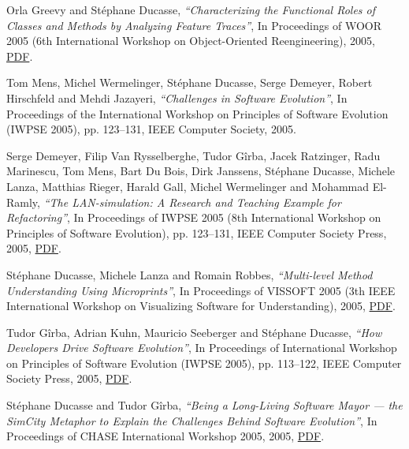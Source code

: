 \documentclass{article}
\newcommand{\czauthors}[1]{#1}
\newcommand{\cztitle}[1]{\emph{``#1''}}
\newcommand{\czbooktitle}[1]{#1}
\begin{document}
\begin{itemize}
	\pub  \czauthors{Orla Greevy and St\'ephane Ducasse},  \cztitle{Characterizing the Functional Roles of Classes and Methods by Analyzing Feature Traces},  In \czbooktitle{Proceedings of WOOR 2005 (6th International Workshop on Object-Oriented Reengineering)}, 2005, \href{http://rmod-files.lille.inria.fr/Team/Texts/Papers/Gree05bTraceScraperWOOR2005.pdf}{PDF}.

	\pub  \czauthors{Tom Mens, Michel Wermelinger, St\'ephane Ducasse, Serge Demeyer, Robert Hirschfeld and Mehdi Jazayeri},  \cztitle{Challenges in Software Evolution},  In \czbooktitle{Proceedings of the International Workshop on Principles of Software Evolution (IWPSE 2005)}, pp. 123--131, IEEE Computer Society, 2005.

	\pub  \czauthors{Serge Demeyer, Filip Van Rysselberghe, Tudor G\^irba, Jacek Ratzinger, Radu Marinescu, Tom Mens, Bart Du Bois, Dirk Janssens, St\'ephane Ducasse, Michele Lanza, Matthias Rieger, Harald Gall, Michel Wermelinger and Mohammad El-Ramly},  \cztitle{The {LAN}-simulation: A Research and Teaching Example for Refactoring},  In \czbooktitle{Proceedings of IWPSE 2005 (8th International Workshop on Principles of Software Evolution)}, pp. 123--131, IEEE Computer Society Press, 2005, \href{http://rmod-files.lille.inria.fr/Team/Texts/Papers/Deme05a-LANRefactoring.pdf}{PDF}.

	\pub  \czauthors{St\'ephane Ducasse, Michele Lanza and Romain Robbes},  \cztitle{Multi-level Method Understanding Using {Microprints}},  In \czbooktitle{Proceedings of {VISSOFT} 2005 (3th IEEE International Workshop on Visualizing Software for Understanding)}, 2005, \href{http://rmod-files.lille.inria.fr/Team/Texts/Papers/Duca05imicroprintsVissoft.pdf}{PDF}.

	\pub  \czauthors{Tudor G\^irba, Adrian Kuhn, Mauricio Seeberger and St\'ephane Ducasse},  \cztitle{How Developers Drive Software Evolution},  In \czbooktitle{Proceedings of International Workshop on Principles of Software Evolution (IWPSE 2005)}, pp. 113--122, IEEE Computer Society Press, 2005, \href{http://rmod-files.lille.inria.fr/Team/Texts/Papers/Girb05cOwnershipMap.pdf}{PDF}.

	\pub  \czauthors{St\'ephane Ducasse and Tudor G\^irba},  \cztitle{Being a Long-Living Software Mayor --- the SimCity Metaphor to Explain the Challenges Behind Software Evolution},  In \czbooktitle{Proceedings of CHASE International Workshop 2005}, 2005, \href{http://rmod-files.lille.inria.fr/Team/Texts/Papers/Duca05dChaseSimCity.pdf}{PDF}.


\end{itemize}
\end{document}
